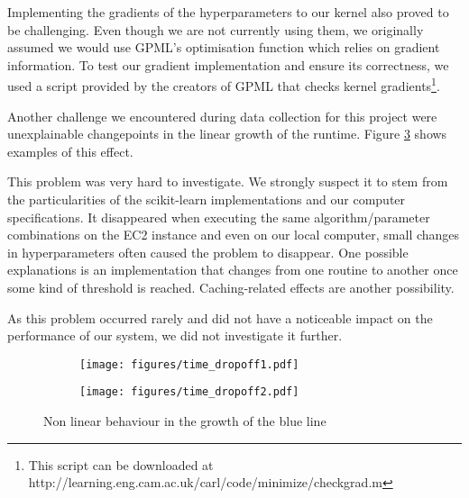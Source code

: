 \documentclass[a4paper,12pt,twoside,openright]{report}
\begin{document}
Implementing the gradients of the hyperparameters to our kernel also proved to be challenging. Even though we are not currently using them, we originally assumed we would use GPML's optimisation function which relies on gradient information. To test our gradient implementation and ensure its correctness, we used a script provided by the creators of GPML that checks kernel gradients\footnote{This script can be downloaded at http://learning.eng.cam.ac.uk/carl/code/minimize/checkgrad.m}. %


Another challenge we encountered during data collection for this project were unexplainable changepoints in the linear growth of the runtime. Figure \ref{time_hinge} shows examples of this effect.

This problem was very hard to investigate. We strongly suspect it to stem from the particularities of the scikit-learn implementations and our computer specifications. It  disappeared when executing the same algorithm/parameter combinations on the EC2 instance and even on our local computer, small changes in hyperparameters often caused the problem to disappear. One possible explanations is an implementation that changes from one routine to another once some kind of threshold is reached. Caching-related effects are another possibility.

As this problem occurred rarely and did not have a noticeable impact on the performance of our system, we did not investigate it further.




\begin{figure}
\centering
\begin{subfigure}{.45\textwidth}
  \centering
  \texttt{[image: figures/time\_dropoff1.pdf]}
  \caption{}
  \label{time_dropoff1}
\end{subfigure}%
\begin{subfigure}{.45\textwidth}
  \centering
  \texttt{[image: figures/time\_dropoff2.pdf]}
  \caption{}
  \label{time_dropoff2}
\end{subfigure}
\caption{Non linear behaviour in the growth of the blue line}
\label{time_hinge}
\end{figure}
\end{document}

